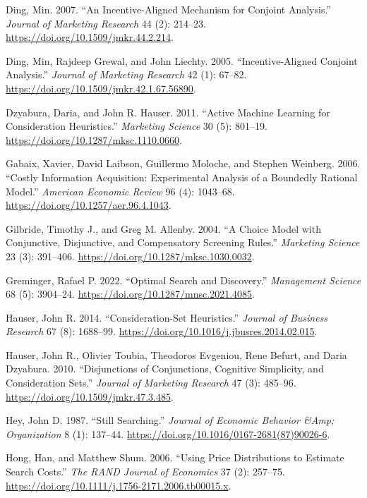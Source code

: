 \documentclass[
  letterpaper,
  DIV=11,
  numbers=noendperiod]{scrartcl}
\newlength{\cslhangindent}
\newenvironment{CSLReferences}[2] %
 {\begin{list}{}{%
  \setlength{\itemindent}{0pt}
  \setlength{\leftmargin}{0pt}
  \setlength{\parsep}{0pt}
  \ifodd #1
   \setlength{\leftmargin}{\cslhangindent}
   \setlength{\itemindent}{-1\cslhangindent}
  \fi
  \setlength{\itemsep}{#2\baselineskip}}}
 {\end{list}}
\begin{document}
\begin{CSLReferences}{1}{1}
Ding, Min. 2007. {``An Incentive-Aligned Mechanism for Conjoint
Analysis.''} \emph{Journal of Marketing Research} 44 (2): 214--23.
\url{https://doi.org/10.1509/jmkr.44.2.214}.

Ding, Min, Rajdeep Grewal, and John Liechty. 2005. {``Incentive-Aligned
Conjoint Analysis.''} \emph{Journal of Marketing Research} 42 (1):
67--82. \url{https://doi.org/10.1509/jmkr.42.1.67.56890}.

Dzyabura, Daria, and John R. Hauser. 2011. {``Active Machine Learning
for Consideration Heuristics.''} \emph{Marketing Science} 30 (5):
801--19. \url{https://doi.org/10.1287/mksc.1110.0660}.

Gabaix, Xavier, David Laibson, Guillermo Moloche, and Stephen Weinberg.
2006. {``Costly Information Acquisition: Experimental Analysis of a
Boundedly Rational Model.''} \emph{American Economic Review} 96 (4):
1043--68. \url{https://doi.org/10.1257/aer.96.4.1043}.

Gilbride, Timothy J., and Greg M. Allenby. 2004. {``A Choice Model with
Conjunctive, Disjunctive, and Compensatory Screening Rules.''}
\emph{Marketing Science} 23 (3): 391--406.
\url{https://doi.org/10.1287/mksc.1030.0032}.

Greminger, Rafael P. 2022. {``Optimal Search and Discovery.''}
\emph{Management Science} 68 (5): 3904--24.
\url{https://doi.org/10.1287/mnsc.2021.4085}.

Hauser, John R. 2014. {``Consideration-Set Heuristics.''} \emph{Journal
of Business Research} 67 (8): 1688--99.
\url{https://doi.org/10.1016/j.jbusres.2014.02.015}.

Hauser, John R., Olivier Toubia, Theodoros Evgeniou, Rene Befurt, and
Daria Dzyabura. 2010. {``Disjunctions of Conjunctions, Cognitive
Simplicity, and Consideration Sets.''} \emph{Journal of Marketing
Research} 47 (3): 485--96. \url{https://doi.org/10.1509/jmkr.47.3.485}.

Hey, John D. 1987. {``Still Searching.''} \emph{Journal of Economic
Behavior \&Amp; Organization} 8 (1): 137--44.
\url{https://doi.org/10.1016/0167-2681(87)90026-6}.

Hong, Han, and Matthew Shum. 2006. {``Using Price Distributions to
Estimate Search Costs.''} \emph{The RAND Journal of Economics} 37 (2):
257--75. \url{https://doi.org/10.1111/j.1756-2171.2006.tb00015.x}.


\end{CSLReferences}
\end{document}
